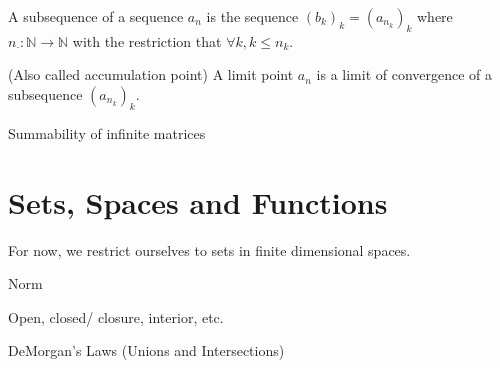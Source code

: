 \begin{definition}[Subsequence]
    A subsequence of a sequence $a_n$ is the sequence $(b_k)_k=(a_{n_k})_k$ where $n_\cdot:\mathbb{N}\rightarrow\mathbb{N}$ with the restriction that $\forall k, k\leq n_k.$
\end{definition}

\begin{definition}
    (Also called accumulation point) A limit point $a_n$ is a limit of convergence of a subsequence $(a_{n_k})_k$.
\end{definition}

\begin{theorem}
\end{theorem}

\begin{lemma}
\end{lemma}


\begin{theorem}
\end{theorem}

\begin{theorem}
Summability of infinite matrices
\end{theorem}

\begin{theorem}
\end{theorem}

\section{Sets, Spaces and Functions}

For now, we restrict ourselves to sets in finite dimensional spaces.

Norm

\begin{theorem}
\end{theorem}

Open, closed/ closure, interior, etc.

DeMorgan's Laws (Unions and Intersections)

